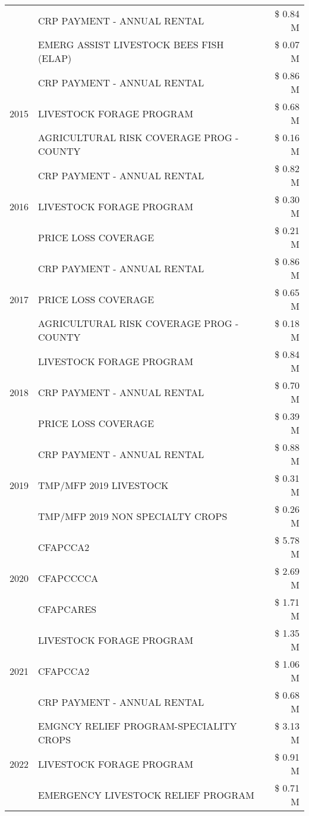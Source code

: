 \begin{tabular}{llr}
 & CRP PAYMENT - ANNUAL RENTAL & \$ 0.84 M \\
 & EMERG ASSIST LIVESTOCK BEES FISH (ELAP) & \$ 0.07 M \\
\cline{1-3}
\multirow[t]{3}{*}{2015} & CRP PAYMENT - ANNUAL RENTAL & \$ 0.86 M \\
 & LIVESTOCK FORAGE PROGRAM & \$ 0.68 M \\
 & AGRICULTURAL RISK COVERAGE PROG - COUNTY & \$ 0.16 M \\
\cline{1-3}
\multirow[t]{3}{*}{2016} & CRP PAYMENT - ANNUAL RENTAL & \$ 0.82 M \\
 & LIVESTOCK FORAGE PROGRAM & \$ 0.30 M \\
 & PRICE LOSS COVERAGE & \$ 0.21 M \\
\cline{1-3}
\multirow[t]{3}{*}{2017} & CRP PAYMENT - ANNUAL RENTAL & \$ 0.86 M \\
 & PRICE LOSS COVERAGE & \$ 0.65 M \\
 & AGRICULTURAL RISK COVERAGE PROG - COUNTY & \$ 0.18 M \\
\cline{1-3}
\multirow[t]{3}{*}{2018} & LIVESTOCK FORAGE PROGRAM & \$ 0.84 M \\
 & CRP PAYMENT - ANNUAL RENTAL & \$ 0.70 M \\
 & PRICE LOSS COVERAGE & \$ 0.39 M \\
\cline{1-3}
\multirow[t]{3}{*}{2019} & CRP PAYMENT - ANNUAL RENTAL & \$ 0.88 M \\
 & TMP/MFP 2019 LIVESTOCK & \$ 0.31 M \\
 & TMP/MFP 2019 NON SPECIALTY CROPS & \$ 0.26 M \\
\cline{1-3}
\multirow[t]{3}{*}{2020} & CFAPCCA2 & \$ 5.78 M \\
 & CFAPCCCCA & \$ 2.69 M \\
 & CFAPCARES & \$ 1.71 M \\
\cline{1-3}
\multirow[t]{3}{*}{2021} & LIVESTOCK FORAGE PROGRAM & \$ 1.35 M \\
 & CFAPCCA2 & \$ 1.06 M \\
 & CRP PAYMENT - ANNUAL RENTAL & \$ 0.68 M \\
\cline{1-3}
\multirow[t]{3}{*}{2022} & EMGNCY RELIEF PROGRAM-SPECIALITY CROPS & \$ 3.13 M \\
 & LIVESTOCK FORAGE PROGRAM & \$ 0.91 M \\
 & EMERGENCY LIVESTOCK RELIEF PROGRAM & \$ 0.71 M \\
\cline{1-3}
\bottomrule
\end{tabular}
